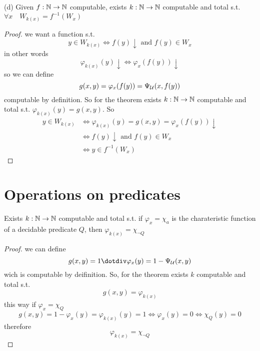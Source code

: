 (d) Given $f : \mathbb{N} \rightarrow \mathbb{N}$ computable, exists $k : \mathbb{N} \rightarrow \mathbb{N}$
computable and total s.t. $\forall x \quad W_{k(x)} = f^{-1}(W_x)$
\begin{proof}
  we want a function s.t.
  \[y \in W_{k(x)} \Leftrightarrow f(y) \downarrow \mbox{ and } f(y)
    \in W_x \]
  in other words
  \[\varphi_{k(x)}(y) \downarrow \Leftrightarrow \varphi_x(f(y))
    \downarrow\]
  so we can define
  \[g(x,y) = \varphi_x(f(y)) = \Psi_{\mathcal{U}}(x, f(y))\] computable by
  definition. So for the \smn theorem exists $k: \mathbb{N} \rightarrow \mathbb{N}$ computable
  and total s.t. \(\varphi_{k(x)}(y) = g(x,y)\). So
  \[
    \begin{split}
      y \in W_{k(x)} & \Leftrightarrow \varphi_{k(x)}(y) = g(x,y) = \varphi_x(f(y)) \downarrow \\
      & \Leftrightarrow f(y)\downarrow \mbox{ and } f(y) \in W_x \\
      & \Leftrightarrow y \in f^{-1}(W_x)
    \end{split}
  \]
\end{proof}

\section{Operations on predicates}
Exists $k : \mathbb{N} \rightarrow \mathbb{N}$ computable and total s.t. if
$\varphi_x = \chi_a$ is the charateristic function of a decidable
predicate $Q$, then $\varphi_{k(x)} = \chi_{\neg Q}$
\begin{proof}
  we can define \[g(x,y) = 1 \dotdiv \varphi_x(y) = 1 - \univ(x,y) \]
  wich is computable by deifinition. So, for the \smn theorem exists
  $k$ computable and total s.t. \[g(x,y) = \varphi_{k(x)}\] this way
  if $\varphi_x = \chi_Q$
  \[
    g(x,y) = 1-\varphi_x(y) = \varphi_{k(x)}(y) = 1 \Leftrightarrow
    \varphi_x(y) = 0 \Leftrightarrow \chi_Q(y) = 0
  \]
  therefore
  \[
    \varphi_{k(x)} = \chi_{\neg Q}
  \]
\end{proof}